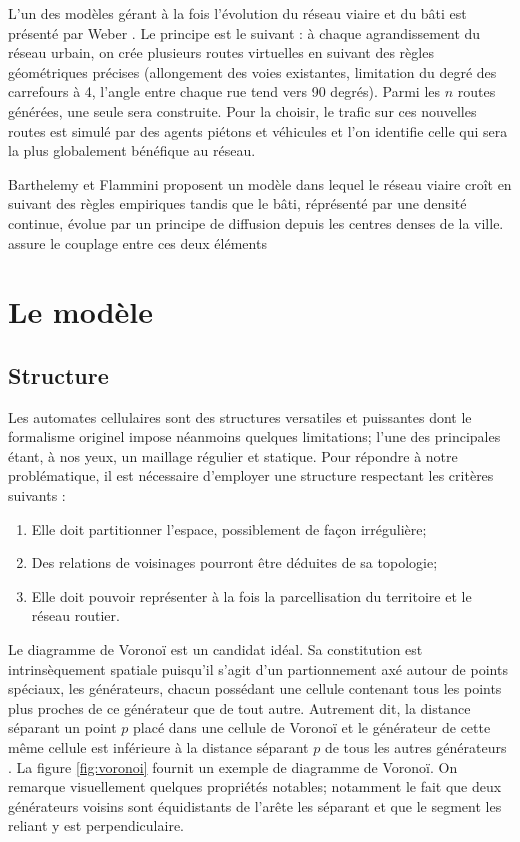 \documentclass[12pt]{article}
\begin{document}
L'un des modèles gérant à la fois l'évolution du réseau viaire et du
bâti est présenté par Weber \cite{Weber2009}. Le principe est le
suivant : à chaque agrandissement du réseau urbain, on crée plusieurs
routes virtuelles en suivant des règles géométriques précises
(allongement des voies existantes, limitation du degré des carrefours
à 4, l'angle entre chaque rue tend vers 90 degrés). Parmi les $n$
routes générées, une seule sera construite. Pour la choisir, le trafic
sur ces nouvelles routes est simulé par des agents piétons et
véhicules et l'on identifie celle qui sera la plus globalement
bénéfique au réseau.

Barthelemy et Flammini \cite{Barthelemy2009} proposent un modèle dans
lequel le réseau viaire croît en suivant des règles empiriques
\cite{Barthelemy2008} tandis que le bâti, réprésenté par une densité
continue, évolue par un principe de diffusion depuis les centres
denses de la ville. assure le couplage entre ces deux éléments

\section{Le modèle}

\subsection{Structure}

Les automates cellulaires sont des structures versatiles et puissantes
dont le formalisme originel impose néanmoins quelques limitations;
l'une des principales étant, à nos yeux, un maillage régulier et
statique. Pour répondre à notre problématique, il est nécessaire
d'employer une structure respectant les critères suivants :

\begin{enumerate}
\item{Elle doit partitionner l'espace, possiblement de façon
  irrégulière;}
\item{Des relations de voisinages pourront être déduites de sa
  topologie;}
\item{Elle doit pouvoir représenter à la fois la parcellisation du
  territoire et le réseau routier.}
\end{enumerate}

Le diagramme de Voronoï est un candidat idéal. Sa constitution est
intrinsèquement spatiale puisqu'il s'agit d'un partionnement axé
autour de points spéciaux, les générateurs, chacun possédant une
cellule contenant tous les points plus proches de ce générateur que de
tout autre. Autrement dit, la distance séparant un point $p$ placé
dans une cellule de Voronoï et le générateur de cette même cellule est
inférieure à la distance séparant $p$ de tous les autres générateurs
\cite{Edwards1993}. La figure \ref{fig:voronoi} fournit un exemple de
diagramme de Voronoï. On remarque visuellement quelques propriétés
notables; notamment le fait que deux générateurs voisins sont
équidistants de l'arête les séparant et que le segment les reliant y
est perpendiculaire.
\end{document}
